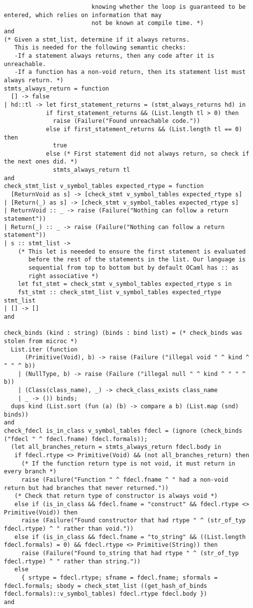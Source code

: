 \documentclass{article}
\begin{document}
\begin{verbatim}
                         knowing whether the loop is guaranteed to be entered, which relies on information that may
                         not be known at compile time. *)
and
(* Given a stmt_list, determine if it always returns.
   This is needed for the following semantic checks:
   -If a statement always returns, then any code after it is unreachable.
   -If a function has a non-void return, then its statement list must always return. *)
stmts_always_return = function
  [] -> false
| hd::tl -> let first_statement_returns = (stmt_always_returns hd) in
            if first_statement_returns && (List.length tl > 0) then
              raise (Failure("Found unreachable code."))
            else if first_statement_returns && (List.length tl == 0) then
              true
            else (* First statement did not always return, so check if the next ones did. *)
              stmts_always_return tl
and
check_stmt_list v_symbol_tables expected_rtype = function
  [ReturnVoid as s] -> [check_stmt v_symbol_tables expected_rtype s]
| [Return(_) as s] -> [check_stmt v_symbol_tables expected_rtype s]
| ReturnVoid :: _ -> raise (Failure("Nothing can follow a return statement"))
| Return(_) :: _ -> raise (Failure("Nothing can follow a return statement"))
| s :: stmt_list ->
    (* This let is neeeded to ensure the first statement is evaluated
       before the rest of the statements in the list. Our language is
       sequential from top to bottom but by default OCaml has :: as
       right associative *)
    let fst_stmt = check_stmt v_symbol_tables expected_rtype s in
    fst_stmt :: check_stmt_list v_symbol_tables expected_rtype stmt_list
| [] -> []
and

check_binds (kind : string) (binds : bind list) = (* check_binds was stolen from microc *)
  List.iter (function
      (Primitive(Void), b) -> raise (Failure ("illegal void " ^ kind ^ " " ^ b))
    | (NullType, b) -> raise (Failure ("illegal null " ^ kind ^ " " ^ b))
    | (Class(class_name), _) -> check_class_exists class_name
    | _ -> ()) binds;
  dups kind (List.sort (fun (a) (b) -> compare a b) (List.map (snd) binds))
and
check_fdecl is_in_class v_symbol_tables fdecl = (ignore (check_binds ("fdecl " ^ fdecl.fname) fdecl.formals));
  (let all_branches_return = stmts_always_return fdecl.body in
   if fdecl.rtype <> Primitive(Void) && (not all_branches_return) then
     (* If the function return type is not void, it must return in every branch *)
     raise (Failure("Function " ^ fdecl.fname ^ " had a non-void return but had branches that never returned."))
   (* Check that return type of constructor is always void *)
   else if (is_in_class && fdecl.fname = "construct" && fdecl.rtype <> Primitive(Void)) then
     raise (Failure("Found constructor that had rtype " ^ (str_of_typ fdecl.rtype) ^ " rather than void."))
   else if (is_in_class && fdecl.fname = "to_string" && ((List.length fdecl.formals) = 0) && fdecl.rtype <> Primitive(String)) then
     raise (Failure("Found to_string that had rtype " ^ (str_of_typ fdecl.rtype) ^ " rather than string."))
   else
     { srtype = fdecl.rtype; sfname = fdecl.fname; sformals = fdecl.formals; sbody = check_stmt_list ((get_hash_of_binds fdecl.formals)::v_symbol_tables) fdecl.rtype fdecl.body })
and


\end{verbatim}
\end{document}

